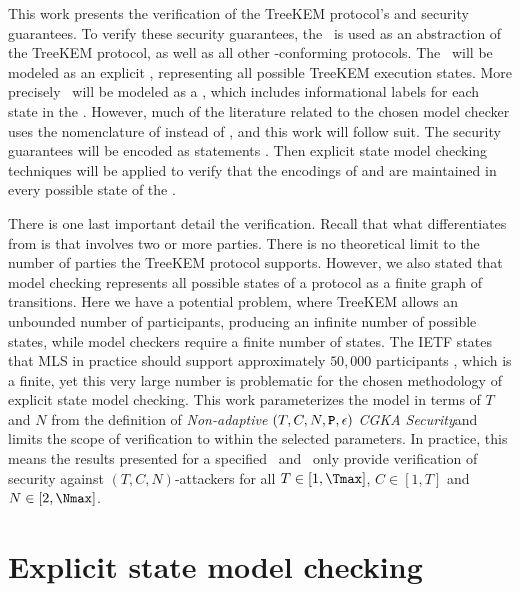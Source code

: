 This work presents the verification of the TreeKEM protocol's  and  security guarantees.
To verify these security guarantees, the \CGKAsec\ is used as an abstraction of the TreeKEM protocol, as well as all other \CGKAdef-conforming protocols.
The \CGKAsec\ will be modeled as an explicit , representing all possible TreeKEM execution states.
More precisely \CGKAsec\ will be modeled as a  \autocite{keller1976formal}, which includes informational labels for each state in the .
However, much of the literature related to the chosen model checker uses the nomenclature of  instead of , and this work will follow suit.
The security guarantees will be encoded as  statements \autocite{4567924}.
Then explicit state model checking techniques will be applied to verify that the  encodings of  and  are maintained in every possible state of the \CGKAsec.

There is one last important detail the verification.
Recall that what differentiates  from  is that  involves two or more parties.
There is no theoretical limit to the number of parties the TreeKEM protocol supports.
However, we also stated that model checking represents all possible states of a protocol as a finite graph of transitions.
Here we have a potential problem, where TreeKEM allows an unbounded number of participants, producing an infinite number of possible states, while model checkers require a finite number of states.
The IETF states that MLS in practice should support approximately $50,000$ participants \autocite{Omara2020}, which is a finite, yet this very large number is problematic for the chosen methodology of explicit state model checking.
This work parameterizes the model in terms of \(T\) and \(N\) from the definition of \emph{Non-adaptive} \((T, C, N, \textbf{\texttt{P}}, \epsilon)\) \emph{CGKA Security}and limits the scope of verification to within the selected parameters.
In practice, this means the results presented for a specified \Tmax\ and \Nmax\ only provide verification of security against \((T, C, N)\)-attackers for all \(T \in [1, \Tmax]\), \(C \in [1, T]\) and \(N \in [2, \Nmax]\).

\hypertarget{sec:explicit-state-model-checking}{%
\section{Explicit state model checking}\label{sec:explicit-state-model-checking}}

